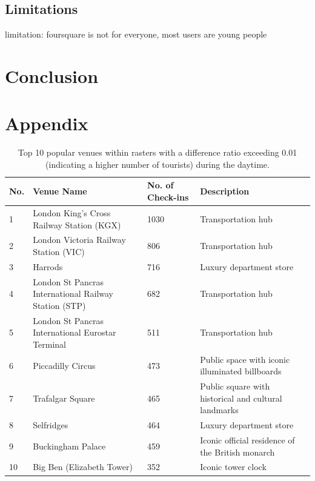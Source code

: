 \documentclass{article}
\begin{document}
\subsection{Limitations}
limitation: foursquare is not for everyone, most users are young people


\clearpage


\section{Conclusion}

\clearpage






\clearpage


\appendix
\section{Appendix} \label{appendix}

\begin{table}[!h]
\centering
\caption{\label{tab:popular_venues_touristspop_daytime}Top 10 popular venues within rasters with a difference ratio exceeding 0.01 (indicating a higher number of tourists) during the daytime.}
\begin{adjustbox}{max width=\textwidth, margin=0cm}
\begin{threeparttable}
\begin{tabular}{lp{5cm}lp{4cm}} \hline
No. & Venue Name & No. of Check-ins & Description \\ \hline
1 & London King's Cross Railway Station (KGX) & 1030 & Transportation hub \\
2 & London Victoria Railway Station (VIC) & 806 & Transportation hub \\
3 & Harrods & 716 & Luxury department store \\
4 & London St Pancras International Railway Station (STP) & 682 & Transportation hub \\
5 & London St Pancras International Eurostar Terminal & 511 & Transportation hub \\
6 & Piccadilly Circus & 473 & Public space with iconic illuminated billboards \\
7 & Trafalgar Square & 465 & Public square with historical and cultural landmarks \\
8 & Selfridges & 464 & Luxury department store \\
9 & Buckingham Palace & 459 & Iconic official residence of the British monarch \\
10 & Big Ben (Elizabeth Tower) & 352 & Iconic tower clock \\ \hline
\end{tabular}
\end{threeparttable}
\end{adjustbox}
\end{table}
\end{document}
